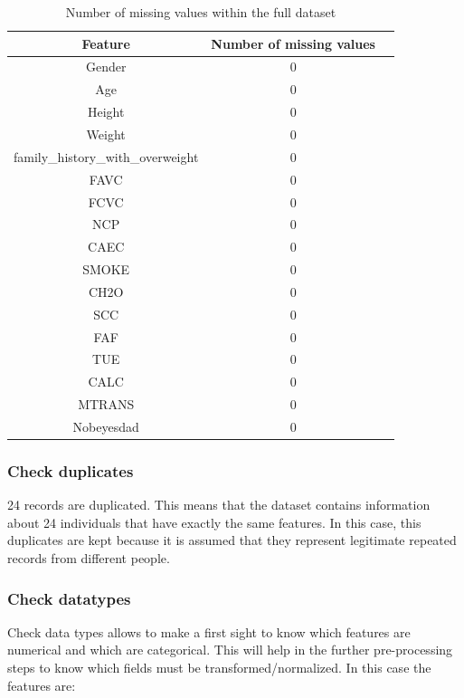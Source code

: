 \documentclass[11pt, a4paper]{article}
\begin{document}
\begin{table}[H]
    \centering
    \begin{tabular}{|c|c|c|}
        \hline
        \textbf{Feature} & \textbf{Number of missing values} \\ \hline
        Gender & 0 \\ \hline
        Age & 0 \\ \hline
        Height & 0 \\ \hline
        Weight & 0 \\ \hline
        family\_history\_with\_overweight & 0 \\ \hline
        FAVC & 0 \\ \hline
        FCVC & 0 \\ \hline
        NCP & 0 \\ \hline
        CAEC & 0 \\ \hline
        SMOKE & 0 \\ \hline
        CH2O & 0 \\ \hline
        SCC & 0 \\ \hline
        FAF & 0 \\ \hline
        TUE & 0 \\ \hline
        CALC & 0 \\ \hline
        MTRANS & 0 \\ \hline
        Nobeyesdad & 0 \\ \hline
    \end{tabular}
    \caption{Number of missing values within the full dataset}
    \label{tab:table_missing_values}
\end{table}

\subsubsection{Check duplicates}

24 records are duplicated. This means that the dataset contains information about 24 individuals that have exactly the same features. 
In this case, this duplicates are kept because it is assumed that they represent legitimate repeated records from different people.

\subsubsection{Check datatypes}

Check data types allows to make a first sight to know which features are numerical and which are categorical. This will help in the further 
pre-processing steps to know which fields must be transformed/normalized. In this case the features are:
\end{document}
